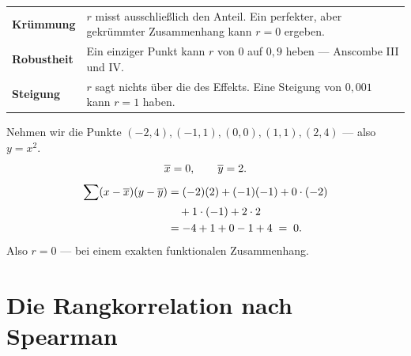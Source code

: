 \begin{warnung}
\begin{center}
\renewcommand{\arraystretch}{1.55}
\begin{tabular}{@{}P{2.8cm}P{5.8cm}@{}}
\toprule
\textbf{Krümmung} & $r$ misst ausschließlich den  Anteil. Ein perfekter, aber gekrümmter Zusammenhang kann $r = 0$ ergeben.\\
\textbf{Robustheit} & Ein einziger Punkt kann $r$ von $0$ auf $0{,}9$ heben --- Anscombe III und IV.\\
\textbf{Steigung} & $r$ sagt nichts über die  des Effekts. Eine Steigung von $0{,}001$ kann $r=1$ haben.\\
\bottomrule
\end{tabular}
\end{center}

Nehmen wir die Punkte $(-2,4), (-1,1), (0,0), (1,1), (2,4)$ --- also $y = x^2$.
\[ \overline{x} = 0, \qquad \overline y = 2 . \]
\begin{align*}
\sum(x-\overline{x})(y-\overline y) &= (-2)(2) + (-1)(-1) + 0 \cdot (-2)\\
&\quad + 1 \cdot (-1) + 2 \cdot 2\\
&= -4+1+0-1+4 \;=\; 0 .
\end{align*}
Also $r = 0$ --- bei einem exakten funktionalen Zusammenhang.

\begin{center}
\end{center}

\begin{center}
\begin{minipage}{0.88\textwidth}
\end{minipage}
\end{center}
\end{warnung}

\section{Die Rangkorrelation nach Spearman}

